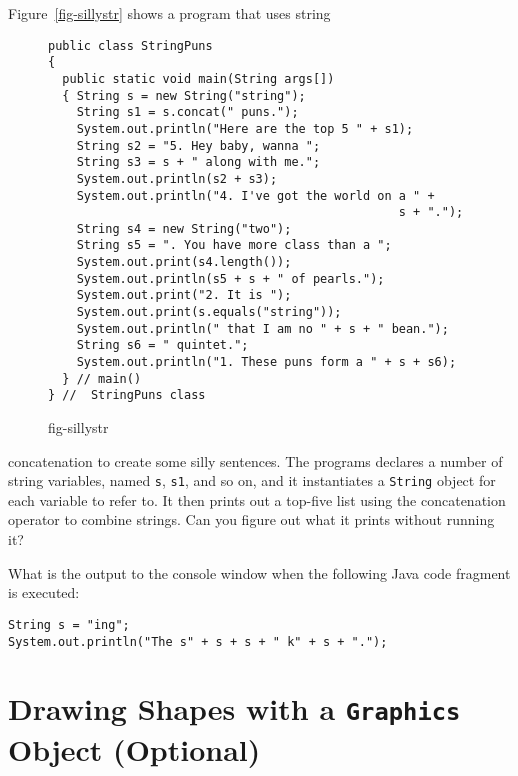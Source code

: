 Figure~\ref{fig-sillystr} shows a program that uses string
\begin{figure}[h!]
\jjjprogstart
\begin{jjjlisting}
\begin{lstlisting}
public class StringPuns 
{
  public static void main(String args[]) 
  { String s = new String("string");
    String s1 = s.concat(" puns.");
    System.out.println("Here are the top 5 " + s1);
    String s2 = "5. Hey baby, wanna ";
    String s3 = s + " along with me.";
    System.out.println(s2 + s3);
    System.out.println("4. I've got the world on a " + 
                                                 s + ".");
    String s4 = new String("two");
    String s5 = ". You have more class than a ";
    System.out.print(s4.length());
    System.out.println(s5 + s + " of pearls.");
    System.out.print("2. It is ");
    System.out.print(s.equals("string"));
    System.out.println(" that I am no " + s + " bean.");
    String s6 = " quintet.";
    System.out.println("1. These puns form a " + s + s6);        
  } // main()
} //  StringPuns class
\end{lstlisting}
\end{jjjlisting}
{fig-sillystr}
\end{figure}
concatenation to create some silly sentences.  The programs declares a
number of string variables, named {\tt s}, {\tt s1}, and so on, and
it instantiates a {\tt String} object for each variable to refer to.
It then prints out a top-five list using the concatenation operator to
combine strings. Can you figure out what it prints without running it?



\begin{SSTUDY}

\item
What is the output to the console window when the following
Java code fragment is executed:

\begin{jjjlisting}
\begin{lstlisting}
String s = "ing";
System.out.println("The s" + s + s + " k" + s + ".");
\end{lstlisting}
\end{jjjlisting}

\end{SSTUDY}


\section{Drawing Shapes with a {\tt Graphics} Object (Optional)}
\label{drawing-shapeswitha-object-optional}

